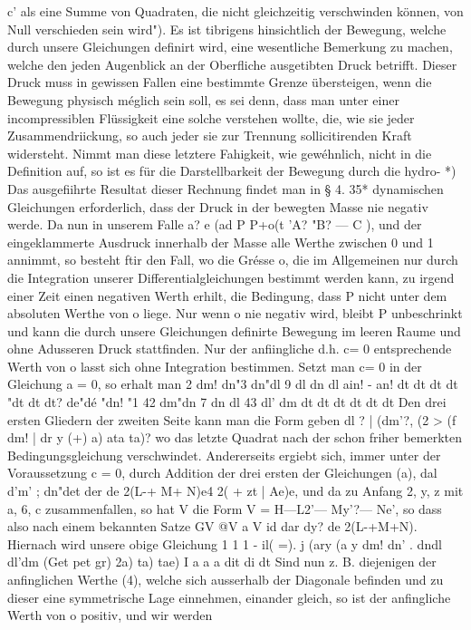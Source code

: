 \documentclass[11pt]{article}
\begin{document}
c’ als eine Summe von Quadraten, die nicht gleichzeitig verschwinden können, von Null
verschieden sein wird"). Es ist tibrigens hinsichtlich der Bewegung, welche durch unsere
Gleichungen definirt wird, eine wesentliche Bemerkung zu machen, welche den jeden
Augenblick an der Oberfliche ausgetibten Druck betrifft. Dieser Druck muss in gewissen
Fallen eine bestimmte Grenze übersteigen, wenn die Bewegung physisch méglich sein
soll, es sei denn, dass man unter einer incompressiblen Flüssigkeit eine solche verstehen
wollte, die, wie sie jeder Zusammendriickung, so auch jeder sie zur Trennung sollicitirenden Kraft widersteht. Nimmt man diese letztere Fahigkeit, wie gewéhnlich, nicht in
die Definition auf, so ist es für die Darstellbarkeit der Bewegung durch die hydro- *)
Das ausgefiihrte Resultat dieser Rechnung findet man in § 4. 35*
dynamischen Gleichungen erforderlich, dass der Druck in der bewegten Masse nie
negativ werde. Da nun in unserem Falle a? e (ad P P+o(t ’A? "B? — C ), und der eingeklammerte Ausdruck innerhalb der Masse alle Werthe zwischen 0 und 1 annimmt, so
besteht ftir den Fall, wo die Grésse o, die im Allgemeinen nur durch die Integration unserer Differentialgleichungen bestimmt werden kann, zu irgend einer Zeit einen negativen
Werth erhilt, die Bedingung, dass P nicht unter dem absoluten Werthe von o liege. Nur
wenn o nie negativ wird, bleibt P unbeschrinkt und kann die durch unsere Gleichungen definirte Bewegung im leeren Raume und ohne Adusseren Druck stattfinden. Nur der
anfiingliche d.h. c= 0 entsprechende Werth von o lasst sich ohne Integration bestimmen.
Setzt man c= 0 in der Gleichung a = 0, so erhalt man 2 dm! dn"3 dn"dl 9 dl dn dl ain!
- an! dt dt dt dt "dt dt dt? de"dé "dn! "1 42 dm"dn 7 dn dl 43 dl’ dm dt dt dt dt dt dt
Den drei ersten Gliedern der zweiten Seite kann man die Form geben dl ? | (dm’?, (2 > (f
dm! | dr y (+) a) ata ta)? wo das letzte Quadrat nach der schon friher bemerkten Bedingungsgleichung verschwindet. Andererseits ergiebt sich, immer unter der Voraussetzung c
= 0, durch Addition der drei ersten der Gleichungen (a), dal d’m’ ; dn"det der de 2(L-+
M+ N)e4 2( + zt | Ae)e, und da zu Anfang 2, y, z mit a, 6, c zusammenfallen, so hat V
die Form V = H—L2’— My’?— Ne’, so dass also nach einem bekannten Satze GV @V a
V id dar dy? de 2(L-+M+N).
Hiernach wird unsere obige Gleichung 1 1 1 - il( =). j (ary (a y dm! dn’ . dndl dl’dm
(Get pet gr) 2a) ta) tae) I a a a dit di dt Sind nun z. B. diejenigen der anfinglichen Werthe
(4), welche sich ausserhalb der Diagonale befinden und zu dieser eine symmetrische Lage
einnehmen, einander gleich, so ist der anfingliche Werth von o positiv, und wir werden
\end{document}
